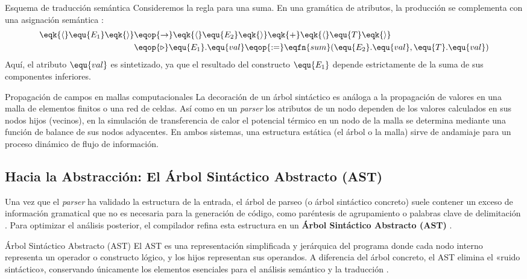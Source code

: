 \begin{ejemplo}{Esquema de traducción semántica}
Consideremos la regla para una suma. En una gramática de atributos, la producción se complementa con una asignación semántica \cite{aho2006compilers}:
\begin{align*}
\eqk{\langle} \equ{E_1} \eqk{\rangle} &\eqop{\rightarrow} \eqk{\langle} \equ{E_2} \eqk{\rangle} \eqk{+} \eqk{\langle} \equ{T} \eqk{\rangle} \\
&\eqop{\triangleright} \equ{E_1}.\equ{val} \eqop{:=} \eqfn{sum}(\equ{E_2}.\equ{val}, \equ{T}.\equ{val})
\end{align*}
Aquí, el atributo $\equ{val}$ es sintetizado, ya que el resultado del constructo $\equ{E_1}$ depende estrictamente de la suma de sus componentes inferiores.
\end{ejemplo}

\begin{fisicaconexion}{Propagación de campos en mallas computacionales}
La decoración de un árbol sintáctico es análoga a la propagación de valores en una malla de elementos finitos o una red de celdas. Así como en un \textit{parser} los atributos de un nodo dependen de los valores calculados en sus nodos hijos (vecinos), en la simulación de transferencia de calor el potencial térmico en un nodo de la malla se determina mediante una función de balance de sus nodos adyacentes. En ambos sistemas, una estructura estática (el árbol o la malla) sirve de andamiaje para un proceso dinámico de flujo de información.
\end{fisicaconexion}

\subsection{Hacia la Abstracción: El Árbol Sintáctico Abstracto (AST)}
\label{subsec:3_7_3_ast}

Una vez que el \textit{parser} ha validado la estructura de la entrada, el árbol de parseo (o árbol sintáctico concreto) suele contener un exceso de información gramatical que no es necesaria para la generación de código, como paréntesis de agrupamiento o palabras clave de delimitación \cite{aho2006compilers}. Para optimizar el análisis posterior, el compilador refina esta estructura en un \textbf{Árbol Sintáctico Abstracto (AST)} \cite{aho2006compilers}.

\begin{definicion}{Árbol Sintáctico Abstracto (AST)}
El AST es una representación simplificada y jerárquica del programa donde cada nodo interno representa un operador o constructo lógico, y los hijos representan sus operandos. A diferencia del árbol concreto, el AST elimina el «ruido sintáctico», conservando únicamente los elementos esenciales para el análisis semántico y la traducción \cite{aho2006compilers}.
\end{definicion}


